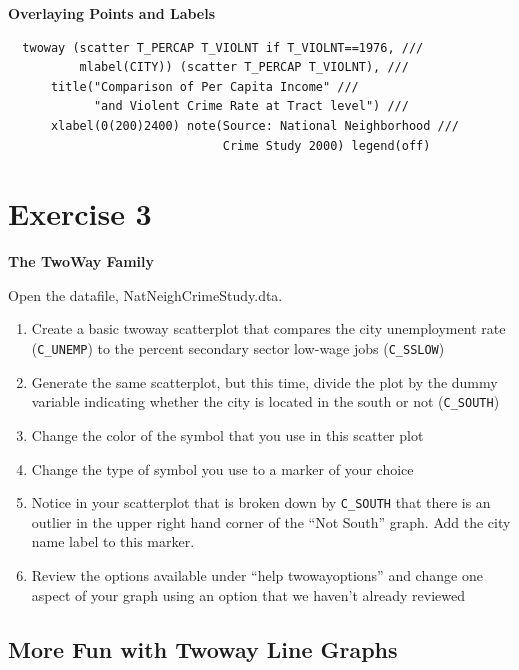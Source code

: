 \documentclass[]{book}
\providecommand{\tightlist}{%
  \setlength{\itemsep}{0pt}\setlength{\parskip}{0pt}}
\begin{document}
\textbf{Overlaying Points and Labels}

\begin{verbatim}
  twoway (scatter T_PERCAP T_VIOLNT if T_VIOLNT==1976, ///
          mlabel(CITY)) (scatter T_PERCAP T_VIOLNT), ///
      title("Comparison of Per Capita Income" ///
            "and Violent Crime Rate at Tract level") ///
      xlabel(0(200)2400) note(Source: National Neighborhood ///
                              Crime Study 2000) legend(off)
\end{verbatim}

\section{Exercise 3}\label{exercise-3-4}

\textbf{The TwoWay Family}

Open the datafile, NatNeighCrimeStudy.dta.

\begin{enumerate}
\def\labelenumi{\arabic{enumi}.}
\tightlist
\item
  Create a basic twoway scatterplot that compares the city unemployment
  rate (\texttt{C\_UNEMP}) to the percent secondary sector low-wage jobs
  (\texttt{C\_SSLOW})
\item
  Generate the same scatterplot, but this time, divide the plot by the
  dummy variable indicating whether the city is located in the south or
  not (\texttt{C\_SOUTH})
\item
  Change the color of the symbol that you use in this scatter plot
\item
  Change the type of symbol you use to a marker of your choice
\item
  Notice in your scatterplot that is broken down by \texttt{C\_SOUTH}
  that there is an outlier in the upper right hand corner of the ``Not
  South'' graph. Add the city name label to this marker.
\item
  Review the options available under ``help twowayoptions'' and change
  one aspect of your graph using an option that we haven't already
  reviewed
\end{enumerate}

\subsection{More Fun with Twoway Line
Graphs}\label{more-fun-with-twoway-line-graphs}
\end{document}
